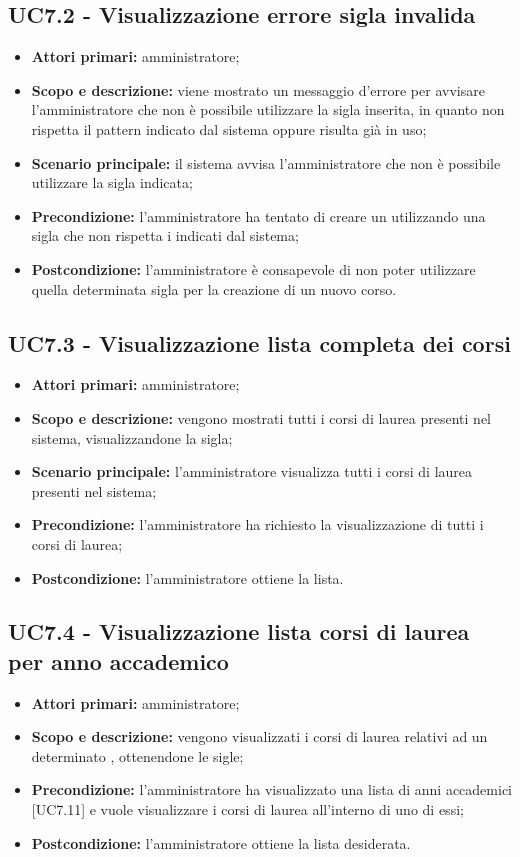 \documentclass[AnalisiDeiRequisiti.tex]{subfiles}
\begin{document}
\subsection{UC7.2 - Visualizzazione errore sigla invalida}
\begin{itemize}
	\item \textbf{Attori primari:} amministratore;
	\item \textbf{Scopo e descrizione:} viene mostrato un messaggio d'errore per avvisare l'amministratore che non è possibile utilizzare la sigla inserita, in quanto non rispetta il pattern indicato dal sistema oppure risulta già in uso;
	\item \textbf{Scenario principale:} il sistema avvisa l'amministratore che non è possibile utilizzare la sigla indicata;
	\item \textbf{Precondizione:} l'amministratore ha tentato di creare un  utilizzando una sigla che non rispetta i  indicati dal sistema; 
	\item \textbf{Postcondizione:} l'amministratore è consapevole di non poter utilizzare quella determinata sigla per la creazione di un nuovo corso.
\end{itemize}\subsection{UC7.3 - Visualizzazione lista completa dei corsi}
\begin{itemize}
	\item \textbf{Attori primari:} amministratore;
	\item \textbf{Scopo e descrizione:} vengono mostrati tutti i corsi di laurea presenti nel sistema, visualizzandone la sigla;
	\item \textbf{Scenario principale:} l'amministratore visualizza tutti i corsi di laurea presenti nel sistema;
	\item \textbf{Precondizione:} l'amministratore ha richiesto la visualizzazione di tutti i corsi di laurea; 
	\item \textbf{Postcondizione:} l'amministratore ottiene la lista.
\end{itemize}
\subsection{UC7.4 - Visualizzazione lista corsi di laurea per anno accademico}
\begin{itemize}
	\item \textbf{Attori primari:} amministratore;
	\item \textbf{Scopo e descrizione:} vengono visualizzati i corsi di laurea relativi ad un determinato , ottenendone le sigle;
	\item \textbf{Precondizione:} l'amministratore ha visualizzato una lista di anni accademici [UC7.11] e vuole visualizzare i corsi di laurea all'interno di uno di essi; 
	\item \textbf{Postcondizione:} l'amministratore ottiene la lista desiderata.
\end{itemize}
\end{document}
